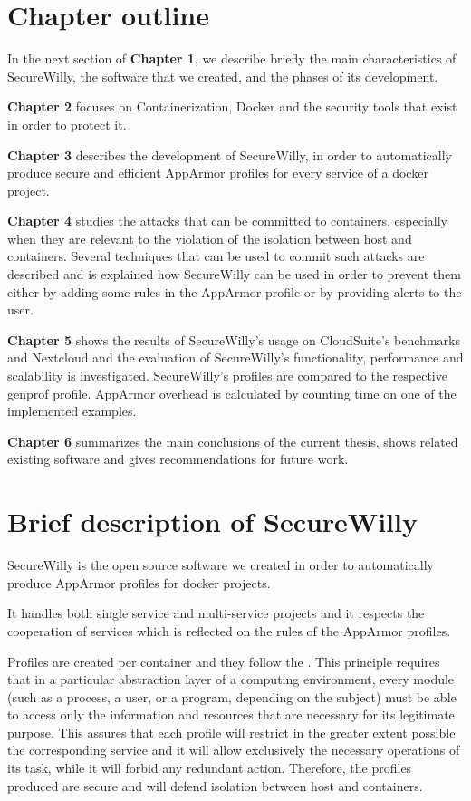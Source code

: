 \section{Chapter outline}
In the next section of \textbf{Chapter 1}, we describe briefly the main characteristics of SecureWilly, the software that we created, and the phases of its development.

\textbf{Chapter 2}  focuses on Containerization, Docker and the security tools that exist in order to protect it.

\textbf{Chapter 3} describes the development of SecureWilly, in order to automatically produce secure and efficient AppArmor profiles for every service of a docker project. 

\textbf{Chapter 4} studies the attacks that can be committed to containers, especially when they are relevant to the violation of the isolation between host and containers. Several techniques that can be used to commit such attacks are described and is explained how SecureWilly can be used in order to prevent them either by adding some rules in the AppArmor profile or by providing alerts to the user.

\textbf{Chapter 5} shows the results of SecureWilly's usage on CloudSuite's benchmarks and Nextcloud and the evaluation of SecureWilly's functionality, performance and scalability is investigated. SecureWilly's profiles are compared to the respective genprof profile. AppArmor overhead is calculated by counting time on one of the implemented examples.

\textbf{Chapter 6} summarizes the main conclusions of the current thesis, shows related existing software and gives recommendations for future work. 

\section{Brief description of SecureWilly}
SecureWilly is the open source software we created in order to automatically produce AppArmor profiles for docker projects.

It handles both single service and multi-service projects and it respects the cooperation of services which is reflected on the rules of the AppArmor profiles.

Profiles are created per container and they follow the . This principle requires that in a particular abstraction layer of a computing environment, every module (such as a process, a user, or a program, depending on the subject) must be able to access only the information and resources that are necessary for its legitimate purpose. \cite{polp} This assures that each profile will restrict in the greater extent possible the corresponding service and it will allow exclusively the necessary operations of its task, while it will forbid any redundant action. Therefore, the profiles produced are secure and will defend isolation between host and containers.

